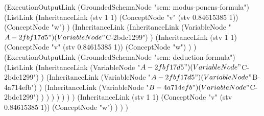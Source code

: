 \documentclass{beamer}
\makeatletter
\newcommand{\reallytiny}{\@setfontsize{\srcsize}{2pt}{2pt}}
\makeatother
\begin{document}
\begin{frame}[fragile]
\begin{columns}
\column{1in}
               
{\reallytiny
\begin{semiverbatim}
            (ExecutionOutputLink
               (GroundedSchemaNode "scm: modus-ponens-formula")
               (ListLink
                  (InheritanceLink (stv 1 1)
                     (ConceptNode "v" (stv 0.84615385 1))
                     (ConceptNode "w")
                  )
                  (InheritanceLink
                     (InheritanceLink
                        (VariableNode "$A-2fbf17d5")
                        (VariableNode "$C-2bdc1299")
                     )
                     (InheritanceLink (stv 1 1)
                        (ConceptNode "v" (stv 0.84615385 1))
                        (ConceptNode "w")
                     )
                  )
                  (ExecutionOutputLink
                     (GroundedSchemaNode "scm: deduction-formula")
                     (ListLink
                        (InheritanceLink
                           (VariableNode "$A-2fbf17d5")
                           (VariableNode "$C-2bdc1299")
                        )
                        (InheritanceLink
                           (VariableNode "$A-2fbf17d5")
                           (VariableNode "$B-4a714efb")
                        )
                        (InheritanceLink
                           (VariableNode "$B-4a714efb")
                           (VariableNode "$C-2bdc1299")
                        )
                     )
                  )
               )
            )
         )
      )
      (InheritanceLink (stv 1 1)
         (ConceptNode "v" (stv 0.84615385 1))
         (ConceptNode "w")
      )
   )
)
\end{semiverbatim}}

\end{columns}

\end{frame}
\end{document}
